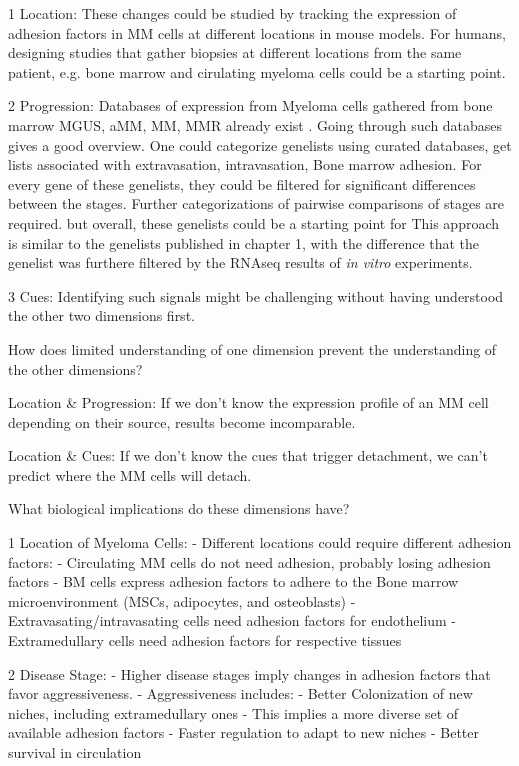 1 Location: These changes could be studied by tracking the expression of adhesion factors in MM cells at
different locations in mouse models. For humans, designing studies that gather
biopsies at different locations from the same patient, e.g. bone marrow and cirulating
myeloma cells could be a starting point.

2 Progression: Databases of expression from Myeloma cells gathered from bone
marrow \ac{MGUS}, \ac{aMM}, \ac{MM}, \ac{MMR} already exist
\citet{akhmetzyanovaDynamicCD138Surface2020,
      seckingerCD38ImmunotherapeuticTarget2018}. Going through such databases gives a
good overview. One could categorize genelists using curated databases, get lists
associated with extravasation, intravasation, Bone marrow adhesion. For every
gene of these genelists, they could be filtered for significant differences
between the stages. Further categorizations of pairwise comparisons of stages
are required. but overall, these genelists could be a starting point for This
approach is similar to the genelists published in chapter 1, with the difference
that the genelist was furthere filtered by the RNAseq results of \textit{in
      vitro} experiments.

3 Cues: Identifying such signals might be challenging without
having understood the other two dimensions first.


How does limited understanding of one dimension prevent the understanding of the
other dimensions?

Location \& Progression: If we don't know the expression profile of an MM cell depending on their
source, results become incomparable.

Location \& Cues: If we don't know the cues that trigger detachment, we can't
predict where the MM cells will detach.




What biological implications do these dimensions have?

1 Location of Myeloma Cells:
- Different locations could require different adhesion factors:
- Circulating MM cells do not need adhesion, probably losing adhesion factors
- BM cells express adhesion factors to adhere to the Bone marrow microenvironment (MSCs, adipocytes, and osteoblasts)
- Extravasating/intravasating cells need adhesion factors for endothelium
- Extramedullary cells need adhesion factors for respective tissues

2 Disease Stage:
- Higher disease stages imply changes in adhesion factors that favor aggressiveness.
- Aggressiveness includes:
- Better Colonization of new niches, including extramedullary ones
- This implies a more diverse set of available adhesion factors
- Faster regulation to adapt to new niches
- Better survival in circulation

